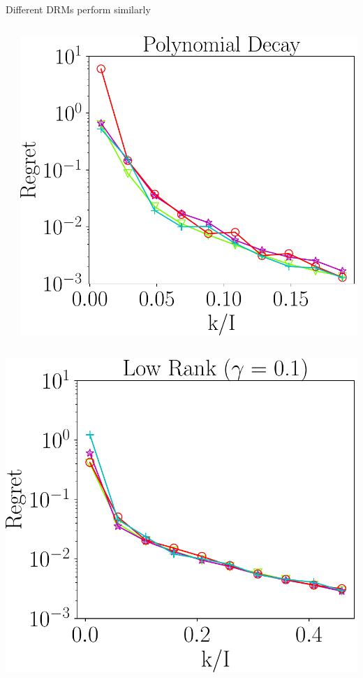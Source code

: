 \documentclass[handout,xcolor={usenames,dvipsnames}]{beamer}
\begin{document}
\begin{frame}{Different DRMs perform similarly}
\begin{columns}
\begin{column}{0.3\textwidth}
	\end{column}
	\begin{column}{0.3\textwidth}
		\includegraphics[scale = 0.25]{fig2_spd_600.pdf}
	\end{column}
\end{columns}
\begin{columns}
	\centering
	\begin{column}{0.3\textwidth}
		\includegraphics[scale = 0.25]{fig2_lk_mnoise_600.pdf}

\end{column}
\end{columns}
\end{frame}
\end{document}
